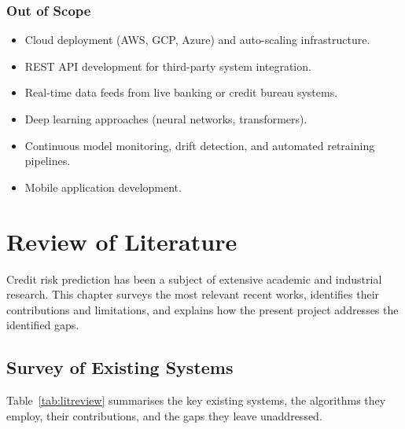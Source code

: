 \documentclass[12pt,a4paper]{report}
\begin{document}
\subsection*{Out of Scope}
\begin{itemize}
    \item Cloud deployment (AWS, GCP, Azure) and auto-scaling infrastructure.
    \item REST API development for third-party system integration.
    \item Real-time data feeds from live banking or credit bureau systems.
    \item Deep learning approaches (neural networks, transformers).
    \item Continuous model monitoring, drift detection, and automated retraining pipelines.
    \item Mobile application development.
\end{itemize}


\chapter{Review of Literature}

Credit risk prediction has been a subject of extensive academic and industrial research. This chapter surveys the most relevant recent works, identifies their contributions and limitations, and explains how the present project addresses the identified gaps.

\section{Survey of Existing Systems}

Table~\ref{tab:litreview} summarises the key existing systems, the algorithms they employ, their contributions, and the gaps they leave unaddressed.
\end{document}
